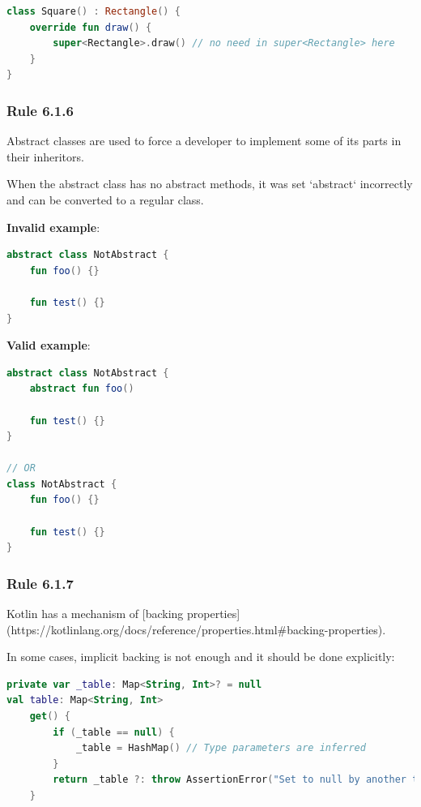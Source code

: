 {{{{\begin{lstlisting}[language=Kotlin]
class Square() : Rectangle() {
    override fun draw() {
        super<Rectangle>.draw() // no need in super<Rectangle> here
    }
}
\end{lstlisting}


\subsubsection*{\textbf{Rule 6.1.6}}
\leavevmode\newline

Abstract classes are used to force a developer to implement some of its parts in their inheritors.

When the abstract class has no abstract methods, it was set `abstract` incorrectly and can be converted to a regular class.



\textbf{Invalid example}:

\begin{lstlisting}[language=Kotlin]
abstract class NotAbstract {
    fun foo() {}

    fun test() {}
}
\end{lstlisting}


\textbf{Valid example}:

\begin{lstlisting}[language=Kotlin]
abstract class NotAbstract {
    abstract fun foo()

    fun test() {}
}

// OR
class NotAbstract {
    fun foo() {}

    fun test() {}
}
\end{lstlisting}




\subsubsection*{\textbf{Rule 6.1.7}}
\leavevmode\newline

Kotlin has a mechanism of [backing properties](https://kotlinlang.org/docs/reference/properties.html\#backing-properties).

In some cases, implicit backing is not enough and it should be done explicitly:

\begin{lstlisting}[language=Kotlin]
private var _table: Map<String, Int>? = null
val table: Map<String, Int>
    get() {
        if (_table == null) {
            _table = HashMap() // Type parameters are inferred
        }
        return _table ?: throw AssertionError("Set to null by another thread")
    }
\end{lstlisting}


}}}}
